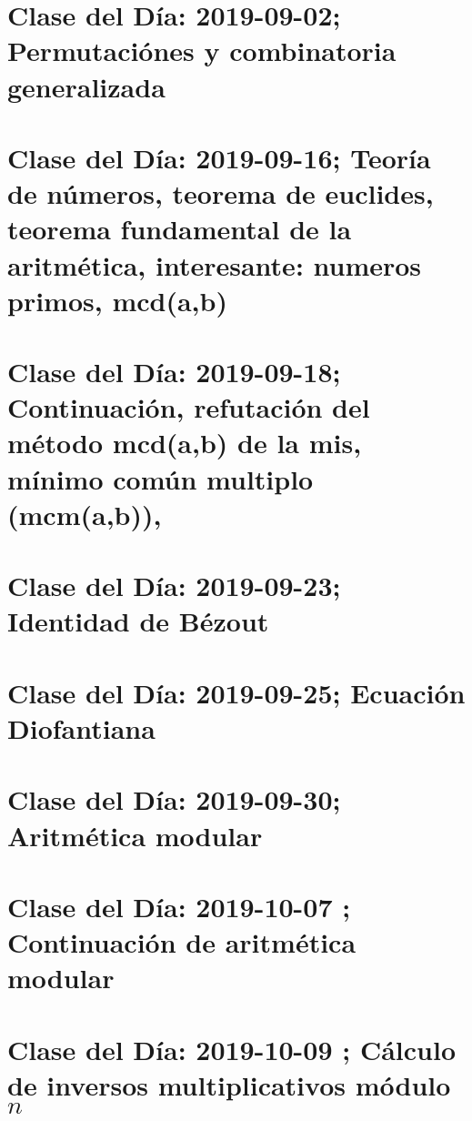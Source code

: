 \documentclass[openany]{book}
\begin{document}
\chapter{Clase del Día: 2019-09-02; Permutaciónes y combinatoria generalizada}


\chapter{Clase del Día: 2019-09-16; Teoría de números, teorema de euclides, teorema fundamental de la aritmética, interesante: numeros primos, mcd(a,b)}



\chapter{Clase del Día: 2019-09-18; Continuación, refutación del método mcd(a,b) de la mis, mínimo común multiplo (mcm(a,b)), }


\chapter{Clase del Día: 2019-09-23; Identidad de Bézout}


\chapter{Clase del Día: 2019-09-25; Ecuación Diofantiana}


\chapter{Clase del Día: 2019-09-30; Aritmética modular}


\chapter{Clase del Día: 2019-10-07 ; Continuación de aritmética modular}


\chapter{Clase del Día: 2019-10-09 ; Cálculo de inversos multiplicativos módulo $n$}

\end{document}
